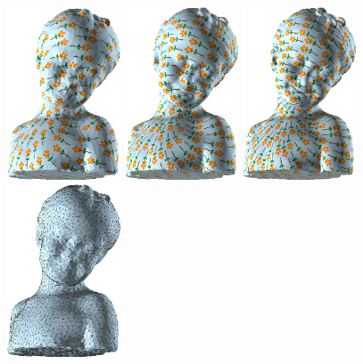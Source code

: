   \begin{figure}
  \centering
  \includegraphics[width=0.3\textwidth]{figs/asd/bimba_nf7k_flower.png}
  \includegraphics[width=0.3\textwidth]{figs/asd/bimba_nf30k_flower.png}
  \includegraphics[width=0.3\textwidth]{figs/asd/bimba_nf149k_flower.png}\\
  \includegraphics[width=0.3\textwidth]{figs/asd/bimba_nf7k_wireframe.png}

\end{figure}
